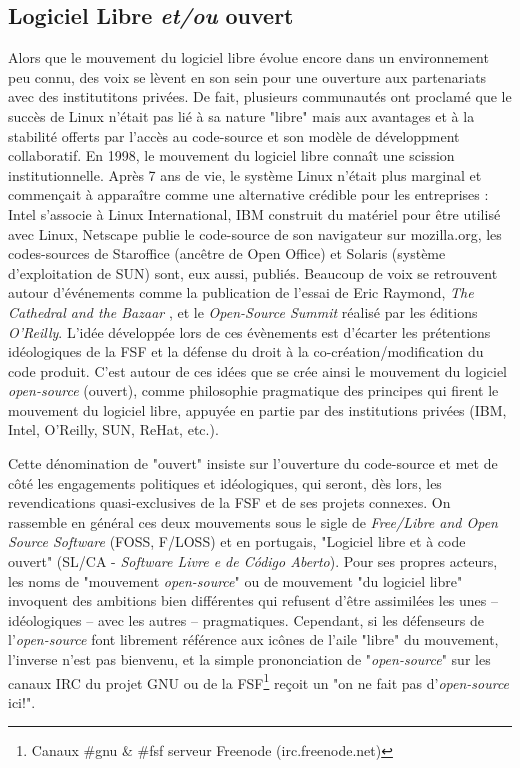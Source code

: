 \subsection{Logiciel Libre \emph{et/ou} ouvert} \label{1.3.2}

Alors que le mouvement du logiciel libre évolue encore dans un environnement peu connu, des voix se lèvent en son sein pour une ouverture aux partenariats avec des institutitons privées. De fait, plusieurs communautés ont proclamé que le succès de Linux n'était pas lié à sa nature "libre" mais aux avantages et à la stabilité offerts par l'accès au code-source et son modèle de développment collaboratif. En 1998, le mouvement du logiciel libre connaît une scission institutionnelle. Après 7 ans de vie, le système Linux n'était plus marginal et commençait à apparaître comme une alternative crédible pour les entreprises : Intel s'associe à Linux International, IBM construit du matériel pour être utilisé avec Linux, Netscape publie le code-source de son navigateur sur mozilla.org, les codes-sources de Staroffice (ancêtre de Open Office) et Solaris (système d'exploitation de SUN) sont, eux aussi, publiés. Beaucoup de voix se retrouvent autour d'événements comme la publication de l'essai de Eric Raymond, \emph{The Cathedral and the Bazaar} \citep{Raymond1997}, et le \emph{Open-Source Summit} réalisé par les éditions \emph{O'Reilly}. L'idée développée lors de ces évènements est d'écarter les prétentions idéologiques de la FSF et la défense du droit à la co-création/modification du code produit. C'est autour de ces idées que se crée ainsi le mouvement du logiciel \emph{open-source} (ouvert), comme philosophie pragmatique des principes qui firent le mouvement du logiciel libre, appuyée en partie par des institutions privées (IBM, Intel, O'Reilly, SUN, ReHat, etc.).

Cette dénomination de "ouvert" insiste sur l'ouverture du code-source et met de côté les engagements politiques et idéologiques, qui seront, dès lors, les revendications quasi-exclusives de la FSF et de ses projets connexes. On rassemble en général ces deux mouvements sous le sigle de \emph{Free/Libre and Open Source Software} (FOSS, F/LOSS) et en portugais, "Logiciel libre et à code ouvert" (SL/CA - \emph{Software Livre e de C\'odigo Aberto}). Pour ses propres acteurs, les noms de "mouvement \emph{open-source}" ou de mouvement "du logiciel libre" invoquent des ambitions bien différentes qui refusent d'être assimilées les unes -- idéologiques -- avec les autres -- pragmatiques. Cependant, si les défenseurs de l'\emph{open-source} font librement référence aux icônes de l'aile "libre" du mouvement, l'inverse n'est pas bienvenu, et la simple prononciation de "\emph{open-source}" sur les canaux IRC du projet GNU ou de la FSF\footnote{Canaux \#gnu \& \#fsf serveur Freenode (irc.freenode.net)} reçoit un "on ne fait pas d'\emph{open-source} ici!".

